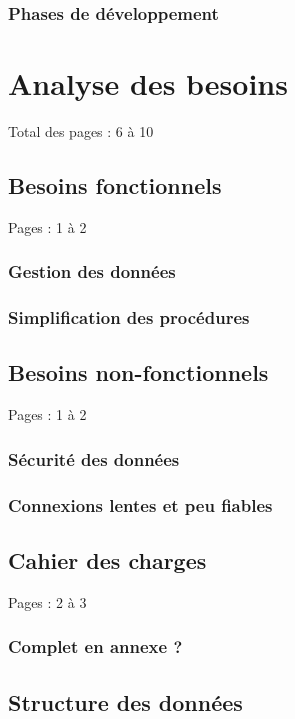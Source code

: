 \documentclass{eplmastersthesis_FR}
\begin{document}
			\subsection*{Phases de développement}

	\chapter{Analyse des besoins}

		Total des pages : 6 à 10

		\section{Besoins fonctionnels}

			Pages : 1 à 2

			\subsection*{Gestion des données}
			\subsection*{Simplification des procédures}

		\section{Besoins non-fonctionnels}

			Pages : 1 à 2

			\subsection*{Sécurité des données}
			\subsection*{Connexions lentes et peu fiables}

		\section{Cahier des charges}

			Pages : 2 à 3

			\subsection*{Complet en annexe ?}

		\section{Structure des données}
\end{document}
